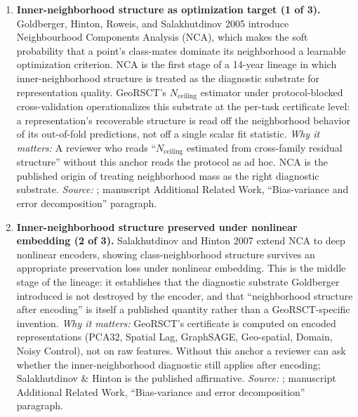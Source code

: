 \documentclass{article}
\begin{document}
\begin{enumerate}

\item \textbf{Inner-neighborhood structure as optimization target (1 of 3).}
Goldberger, Hinton, Roweis, and Salakhutdinov 2005 introduce Neighbourhood Components Analysis (NCA), which makes the soft probability that a point's class-mates dominate its neighborhood a learnable optimization criterion. NCA is the first stage of a 14-year lineage in which inner-neighborhood structure is treated as the diagnostic substrate for representation quality. GeoRSCT's $N_{\text{ceiling}}$ estimator under protocol-blocked cross-validation operationalizes this substrate at the per-task certificate level: a representation's recoverable structure is read off the neighborhood behavior of its out-of-fold predictions, not off a single scalar fit statistic.
\emph{Why it matters:} A reviewer who reads ``$N_{\text{ceiling}}$ estimated from cross-family residual structure'' without this anchor reads the protocol as ad hoc. NCA is the published origin of treating neighborhood mass as the right diagnostic substrate.
\emph{Source:} \citet{goldberger2005neighbourhood}; manuscript Additional Related Work, ``Bias-variance and error decomposition'' paragraph.

\item \textbf{Inner-neighborhood structure preserved under nonlinear embedding (2 of 3).}
Salakhutdinov and Hinton 2007 extend NCA to deep nonlinear encoders, showing class-neighborhood structure survives an appropriate preservation loss under nonlinear embedding. This is the middle stage of the lineage: it establishes that the diagnostic substrate Goldberger introduced is not destroyed by the encoder, and that ``neighborhood structure after encoding'' is itself a published quantity rather than a GeoRSCT-specific invention.
\emph{Why it matters:} GeoRSCT's certificate is computed on encoded representations (PCA32, Spatial Lag, GraphSAGE, Geo-spatial, Domain, Noisy Control), not on raw features. Without this anchor a reviewer can ask whether the inner-neighborhood diagnostic still applies after encoding; Salakhutdinov \& Hinton is the published affirmative.
\emph{Source:} \citet{salakhutdinov2007learning}; manuscript Additional Related Work, ``Bias-variance and error decomposition'' paragraph.


\end{enumerate}
\end{document}
